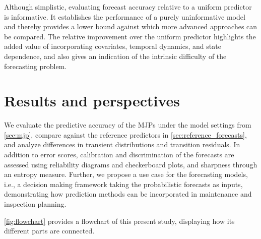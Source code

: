 \documentclass{article}
\begin{document}
Although simplistic, evaluating forecast accuracy relative to a uniform predictor is informative. It establishes the performance of a purely uninformative model and thereby provides a lower bound against which more advanced approaches can be compared. The relative improvement over the uniform predictor highlights the added value of incorporating covariates, temporal dynamics, and state dependence, and also gives an indication of the intrinsic difficulty of the forecasting problem.








 


\section{Results and perspectives} \label{sec:results}
We evaluate the predictive accuracy of the MJPs under the model settings from \cref{sec:mjp}, compare against the reference predictors in \cref{sec:reference_forecasts}, and analyze differences in transient distributions and transition residuals. In addition to error scores, calibration and discrimination of the forecasts are assessed using reliability diagrams and checkerboard plots, and sharpness through an entropy measure. Further, we propose a use case for the forecasting models, i.e., a decision making framework taking the probabilistic forecasts as inputs, demonstrating how prediction methods can be incorporated in maintenance and inspection planning.

\cref{fig:flowchart} provides a flowchart of this present study, displaying how its different parts  are connected.
\end{document}
